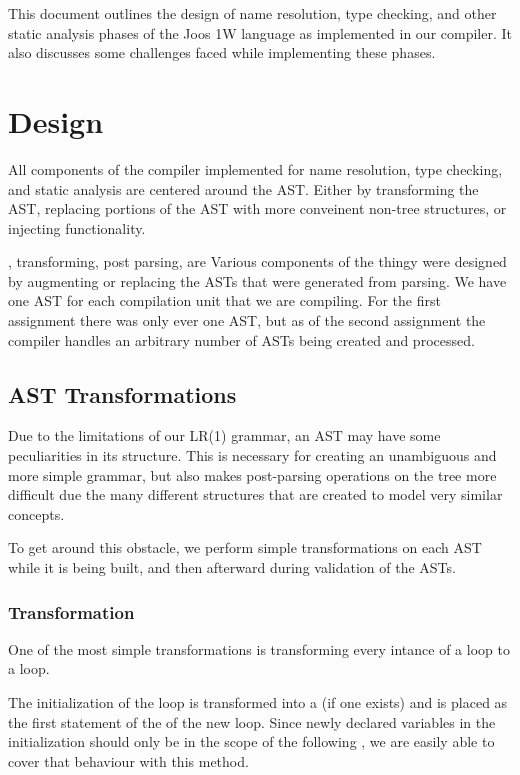 \documentclass[pdftex,11pt,a4paper]{article}
\begin{document}

This document outlines the design of name resolution, type checking,
and other static analysis phases of the Joos 1W language as
implemented in our compiler. It also discusses some challenges faced
while implementing these phases.


\section{Design}

All components of the compiler implemented for name resolution, type
checking, and static analysis are centered around the AST. Either by
transforming the AST, replacing portions of the AST with more
conveinent non-tree structures, or injecting functionality.


, transforming, post parsing, are Various components of the thingy were designed by augmenting or
replacing the ASTs that were generated from parsing. We have one AST
for each compilation unit that we are compiling. For the first
assignment there was only ever one AST, but as of the second
assignment the compiler handles an arbitrary number of ASTs being
created and processed.

\subsection{AST Transformations}

Due to the limitations of our LR(1) grammar, an AST may have some peculiarities
in its structure. This is necessary for creating an unambiguous and more
simple grammar, but also makes post-parsing operations on the tree more
difficult due the many different structures that are created to model very
similar concepts.

To get around this obstacle, we perform simple transformations on each AST
while it is being built, and then afterward during validation of the ASTs.

\subsubsection{ Transformation}

One of the most simple transformations is transforming every intance of a
 loop to a  loop.

The initialization of the  loop is transformed into a 
(if one exists) and is placed as the first statement of the  of
the new  loop. Since newly declared variables in the initialization
should only be in the scope of the following , we are easily able
to cover that behaviour with this method.
\end{document}
